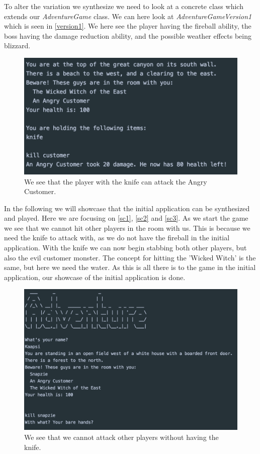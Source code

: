 To alter the variation we synthesize we need to look at a concrete class which extends our \textit{AdventureGame} class. We can here look at \textit{AdventureGameVersion1} which is seen in \autoref{version1}. We here see the player having the fireball ability, the boss having the damage reduction ability, and the possible weather effects being blizzard.

\begin{figure}
	\centering
	\includegraphics[width=\linewidth]{Materials/Results/AttackingCustomer}
	\caption{We see that the player with the knife can attack the Angry Customer.}
	\label{sc1}
\end{figure}
In the following we will showcase that the initial application can be synthesized and played. Here we are focusing on \autoref{sc1}, \autoref{sc2} and \autoref{sc3}. As we start the game we see that we cannot hit other players in the room with us. This is because we need the knife to attack with, as we do not have the fireball in the initial application. With the knife we can now begin stabbing both other players, but also the evil customer monster. The concept for hitting the 'Wicked Witch' is the same, but here we need the water. As this is all there is to the game in the initial application, our showcase of the initial application is done.

\begin{figure}[H]
	\centering
	\includegraphics[width=0.9\linewidth]{Materials/Results/PlayersEntering}
	\caption{We see that we cannot attack other players without having the knife.}
	\label{sc2}
\end{figure}


